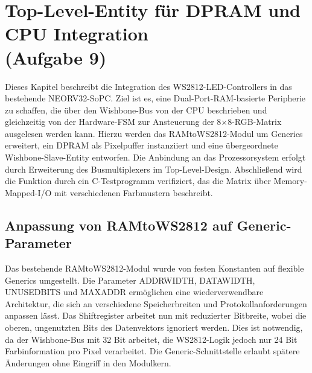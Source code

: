 \newpage
\section{Top-Level-Entity für DPRAM und CPU Integration \\ (Aufgabe 9)}

Dieses Kapitel beschreibt die Integration des WS2812-LED-Controllers in das 
bestehende NEORV32-SoPC. Ziel ist es, eine Dual-Port-RAM-basierte 
Peripherie zu schaffen, die über den Wishbone-Bus von der CPU beschrieben 
und gleichzeitig von der Hardware-FSM zur Ansteuerung der 8×8-RGB-Matrix 
ausgelesen werden kann. Hierzu werden das RAMtoWS2812-Modul um Generics 
erweitert, ein DPRAM als Pixelpuffer instanziiert und eine übergeordnete 
Wishbone-Slave-Entity entworfen. Die Anbindung an das Prozessorsystem 
erfolgt durch Erweiterung des Busmultiplexers im Top-Level-Design. 
Abschließend wird die Funktion durch ein C-Testprogramm verifiziert, das 
die Matrix über Memory-Mapped-I/O mit verschiedenen Farbmustern beschreibt.

\subsection{Anpassung von RAMtoWS2812 auf Generic-Parameter}

Das bestehende RAMtoWS2812-Modul wurde von festen Konstanten auf flexible
 Generics umgestellt. Die Parameter ADDR\textunderscore WIDTH, DATA\textunderscore WIDTH, UNUSED\textunderscore BITS 
 und MAX\textunderscore ADDR ermöglichen eine wiederverwendbare Architektur, die sich 
 an verschiedene Speicherbreiten und Protokollanforderungen anpassen 
 lässt. Das Shiftregister arbeitet nun mit reduzierter Bitbreite, wobei 
 die oberen, ungenutzten Bits des Datenvektors ignoriert werden. Dies ist 
 notwendig, da der Wishbone-Bus mit 32 Bit arbeitet, die WS2812-Logik 
 jedoch nur 24 Bit Farbinformation pro Pixel verarbeitet. Die 
Generic-Schnittstelle erlaubt spätere Änderungen ohne Eingriff in den Modulkern.

\inputminted[linenos,frame=single,fontsize=\footnotesize]{vhdl}{A9_Abgabe/iceduino_setup/osflow/boards/iceduino/RAMtoWS2812.vhd}

\inputminted[linenos,frame=single,fontsize=\footnotesize]{vhdl}{A9_Abgabe/iceduino_setup/osflow/boards/iceduino/addresscounter.vhd}

\inputminted[linenos,frame=single,fontsize=\footnotesize]{vhdl}{A9_Abgabe/iceduino_setup/osflow/boards/iceduino/shiftregister.vhd}


